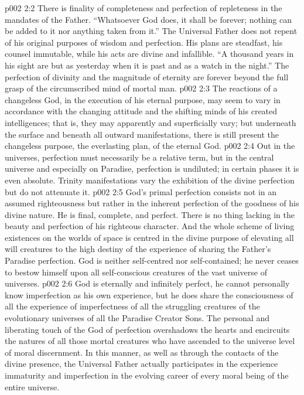 \vs p002 2:2 There is finality of completeness and perfection of repleteness in the mandates of the Father. “Whatsoever God does, it shall be forever; nothing can be added to it nor anything taken from it.” The Universal Father does not repent of his original purposes of wisdom and perfection. His plans are steadfast, his counsel immutable, while his acts are divine and infallible. “A thousand years in his sight are but as yesterday when it is past and as a watch in the night.” The perfection of divinity and the magnitude of eternity are forever beyond the full grasp of the circumscribed mind of mortal man.
\vs p002 2:3 \pc The reactions of a changeless God, in the execution of his eternal purpose, may seem to vary in accordance with the changing attitude and the shifting minds of his created intelligences; that is, they may apparently and superficially vary; but underneath the surface and beneath all outward manifestations, there is still present the changeless purpose, the everlasting plan, of the eternal God.
\vs p002 2:4 Out in the universes, perfection must necessarily be a relative term, but in the central universe and especially on Paradise, perfection is undiluted; in certain phases it is even absolute. Trinity manifestations vary the exhibition of the divine perfection but do not attenuate it.
\vs p002 2:5 \pc God’s primal perfection consists not in an assumed righteousness but rather in the inherent perfection of the goodness of his divine nature. He is final, complete, and perfect. There is no thing lacking in the beauty and perfection of his righteous character. And the whole scheme of living existences on the worlds of space is centred in the divine purpose of elevating all will creatures to the high destiny of the experience of sharing the Father’s Paradise perfection. God is neither self\hyp{}centred nor self\hyp{}contained; he never ceases to bestow himself upon all self\hyp{}conscious creatures of the vast universe of universes.
\vs p002 2:6 God is eternally and infinitely perfect, he cannot personally know imperfection as his own experience, but he does share the consciousness of all the experience of imperfectness of all the struggling creatures of the evolutionary universes of all the Paradise Creator Sons. The personal and liberating touch of the God of perfection overshadows the hearts and encircuits the natures of all those mortal creatures who have ascended to the universe level of moral discernment. In this manner, as well as through the contacts of the divine presence, the Universal Father actually participates in the experience  immaturity and imperfection in the evolving career of every moral being of the entire universe.
